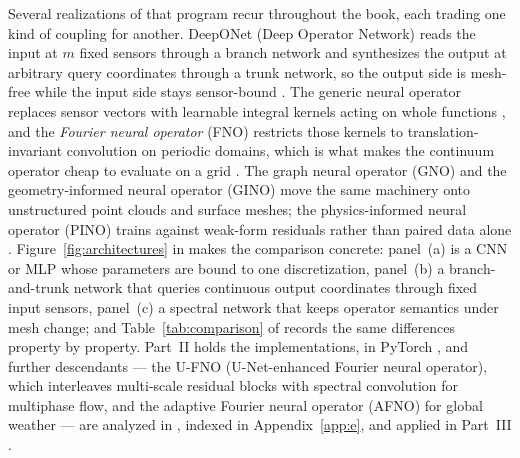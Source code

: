 
Several realizations of that program recur throughout the book, each trading one kind of
coupling for another. DeepONet (Deep Operator Network) reads the input at $m$ fixed
sensors through a branch network and synthesizes the output at arbitrary query coordinates
through a trunk network, so the output side is mesh-free while the input side stays
sensor-bound \cite{lu2021learning}. The
generic neural operator replaces
sensor vectors with learnable integral kernels acting on whole functions
\cite{kovachki2023neural}, and the \emph{Fourier neural
operator} (FNO) restricts those kernels to translation-invariant convolution on periodic
domains, which is what makes the continuum operator cheap to evaluate on a grid
\cite{li2021fourier}. The graph neural operator (GNO) and the
geometry-informed neural operator (GINO) move the same machinery onto
unstructured point clouds and surface meshes; the
physics-informed neural operator (PINO) trains
against weak-form residuals rather than paired data alone \cite{li2023geometry, li2021physics}.
Figure~\ref{fig:architectures} in
 makes the comparison concrete:
panel~(a) is a CNN or MLP whose parameters are bound to one discretization, panel~(b) a
branch-and-trunk network that queries continuous output coordinates through fixed input
sensors, panel~(c) a spectral network that keeps operator semantics under mesh change; and
Table~\ref{tab:comparison} of
 records the same differences
property by property. Part~II holds the implementations, in PyTorch \cite{paszke2019pytorch},
and further descendants --- the U-FNO (U-Net-enhanced Fourier neural operator), which interleaves
multi-scale residual blocks with spectral convolution for multiphase flow, and the
adaptive Fourier neural operator (AFNO) for
global weather --- are analyzed
in , indexed in
Appendix~\ref{app:e}, and applied in Part~III
\cite{wen2022ufno, pathak2022fourcastnet}.

